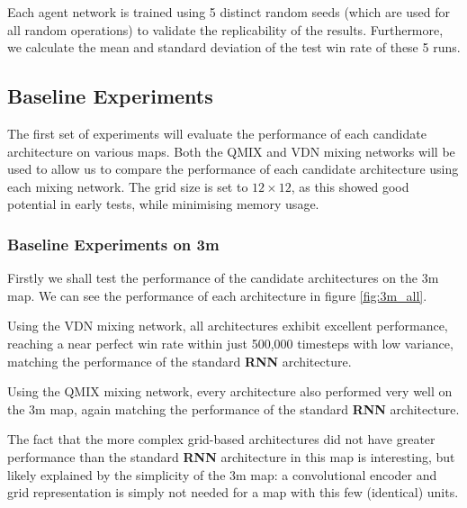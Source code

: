 Each agent network is trained using 5 distinct random seeds (which are used for all random operations) to validate the replicability of the results. Furthermore, we calculate the mean and standard deviation of the test win rate of these 5 runs.

\subsection{Baseline Experiments}

The first set of experiments will evaluate the performance of each candidate architecture on various maps. Both the QMIX and VDN mixing networks will be used to allow us to compare the performance of each candidate architecture using each mixing network. The grid size is set to $12\times12$, as this showed good potential in early tests, while minimising memory usage.


\subsubsection{Baseline Experiments on 3m}

Firstly we shall test the performance of the candidate architectures on the 3m map. We can see the performance of each architecture in figure \ref{fig:3m_all}. 

Using the VDN mixing network, all architectures exhibit excellent performance, reaching a near perfect win rate within just 500,000 timesteps with low variance, matching the performance of the standard \textbf{RNN} architecture.

Using the QMIX mixing network, every architecture also performed very well on the 3m map, again matching the performance of the standard \textbf{RNN} architecture. 

The fact that the more complex grid-based architectures did not have greater performance than the standard \textbf{RNN} architecture in this map is interesting, but likely explained by the simplicity of the 3m map: a convolutional encoder and grid representation is simply not needed for a map with this few (identical) units.

